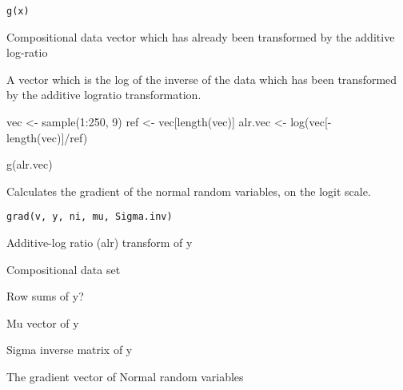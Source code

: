 \documentclass[a4paper]{book}
\begin{document}
%
\begin{Usage}
\begin{verbatim}
g(x)
\end{verbatim}
\end{Usage}
%
\begin{Arguments}
\begin{ldescription}
\item[\code{x}] Compositional data vector which has already been transformed by the 
additive log-ratio
\end{ldescription}
\end{Arguments}
%
\begin{Value}
A vector which is the log of the inverse of the data which has been
transformed by the additive logratio transformation.
\end{Value}
%
\begin{Examples}
\begin{ExampleCode}
vec <- sample(1:250, 9)
ref <- vec[length(vec)]
alr.vec <- log(vec[-length(vec)]/ref)

g(alr.vec)

\end{ExampleCode}
\end{Examples}
%
\begin{Description}\relax
Calculates the gradient of the normal random variables, on the logit scale.
\end{Description}
%
\begin{Usage}
\begin{verbatim}
grad(v, y, ni, mu, Sigma.inv)
\end{verbatim}
\end{Usage}
%
\begin{Arguments}
\begin{ldescription}
\item[\code{v}] Additive-log ratio (alr) transform of y

\item[\code{y}] Compositional data set

\item[\code{ni}] Row sums of y?

\item[\code{mu}] Mu vector of y

\item[\code{Sigma.inv}] Sigma inverse matrix of y
\end{ldescription}
\end{Arguments}
%
\begin{Value}
The gradient vector of Normal random variables
\end{Value}
\end{document}
